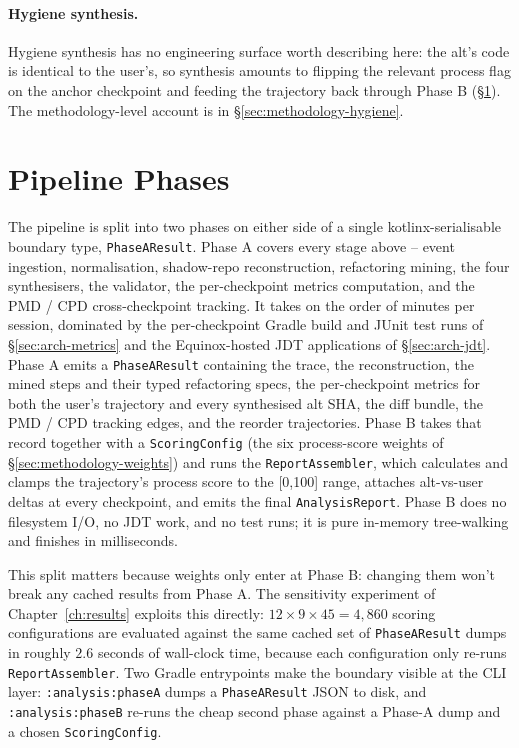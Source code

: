 \paragraph{Hygiene synthesis.}
Hygiene synthesis has no engineering surface worth describing here: the alt's code is identical to the user's, so synthesis amounts to flipping the relevant process flag on the anchor checkpoint and feeding the trajectory back through Phase B (\S\ref{sec:arch-phases}). The methodology-level account is in \S\ref{sec:methodology-hygiene}.

\section{Pipeline Phases}
\label{sec:arch-phases}

The pipeline is split into two phases on either side of a single kotlinx-serialisable boundary type, \texttt{PhaseAResult}. Phase A covers every stage above -- event ingestion, normalisation, shadow-repo reconstruction, refactoring mining, the four synthesisers, the validator, the per-checkpoint metrics computation, and the PMD / CPD cross-checkpoint tracking. It takes on the order of minutes per session, dominated by the per-checkpoint Gradle build and JUnit test runs of \S\ref{sec:arch-metrics} and the Equinox-hosted JDT applications of \S\ref{sec:arch-jdt}. Phase A emits a \texttt{PhaseAResult} containing the trace, the reconstruction, the mined steps and their typed refactoring specs, the per-checkpoint metrics for both the user's trajectory and every synthesised alt SHA, the diff bundle, the PMD / CPD tracking edges, and the reorder trajectories. Phase B takes that record together with a \texttt{ScoringConfig} (the six process-score weights of \S\ref{sec:methodology-weights}) and runs the \texttt{ReportAssembler}, which calculates and clamps the trajectory's process score to the [0,100] range, attaches alt-vs-user deltas at every checkpoint, and emits the final \texttt{AnalysisReport}. Phase B does no filesystem I/O, no JDT work, and no test runs; it is pure in-memory tree-walking and finishes in milliseconds.

This split matters because weights only enter at Phase B: changing them won't break any cached results from Phase A. The sensitivity experiment of Chapter~\ref{ch:results} exploits this directly: $12 \times 9 \times 45 = 4{,}860$ scoring configurations are evaluated against the same cached set of \texttt{PhaseAResult} dumps in roughly $2.6$ seconds of wall-clock time, because each configuration only re-runs \texttt{ReportAssembler}. Two Gradle entrypoints make the boundary visible at the CLI layer: \texttt{:analysis:phaseA} dumps a \texttt{PhaseAResult} JSON to disk, and \texttt{:analysis:phaseB} re-runs the cheap second phase against a Phase-A dump and a chosen \texttt{ScoringConfig}.

